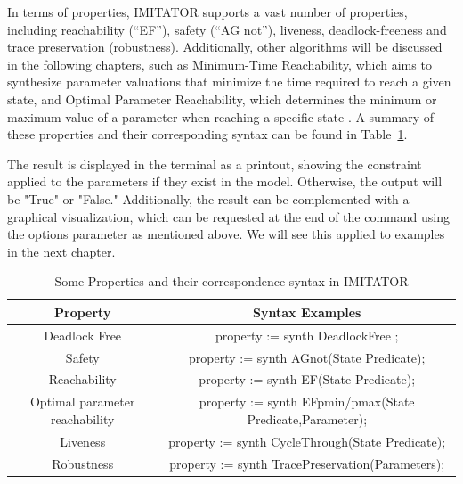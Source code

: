 In terms of properties, IMITATOR supports a vast number of properties, including reachability (“EF”), safety (“AG not”), liveness, deadlock-freeness and trace preservation (robustness). Additionally, other algorithms will be discussed in the following chapters, such as Minimum-Time Reachability, which aims to synthesize parameter valuations that minimize the time required to reach a given state, and Optimal Parameter Reachability, which determines the minimum or maximum value of a parameter when reaching a specific state \cite{IMITATOR}. A summary of these properties and their corresponding syntax can be found in Table~\ref{tab:imitator-properties}.




The result is displayed in the terminal as a printout, showing the constraint applied to the parameters if they exist in the model. Otherwise, the output will be "True" or "False." Additionally, the result can be complemented with a graphical visualization, which can be requested at the end of the command using the options parameter as mentioned above. We will see this applied to examples in the next chapter.


\begin{table}[H]
\centering
\caption{Some Properties and their correspondence syntax in IMITATOR \cite{IMITATOR}}
\label{tab:imitator-properties}
\begin{tabular}{|c|c|}
\hline
\textbf{Property} & \textbf{Syntax Examples} \\ \hline
Deadlock Free & property := synth DeadlockFree ; \\ \hline
Safety & property := synth AGnot(State Predicate); \\ \hline
Reachability & property := synth EF(State Predicate); \\ \hline
Optimal parameter reachability & property := synth EFpmin/pmax(State Predicate,Parameter); %
\\ \hline
Liveness & property := synth CycleThrough(State Predicate); \\ \hline
Robustness & property := synth TracePreservation(Parameters); \\ \hline
\end{tabular}
\end{table}

